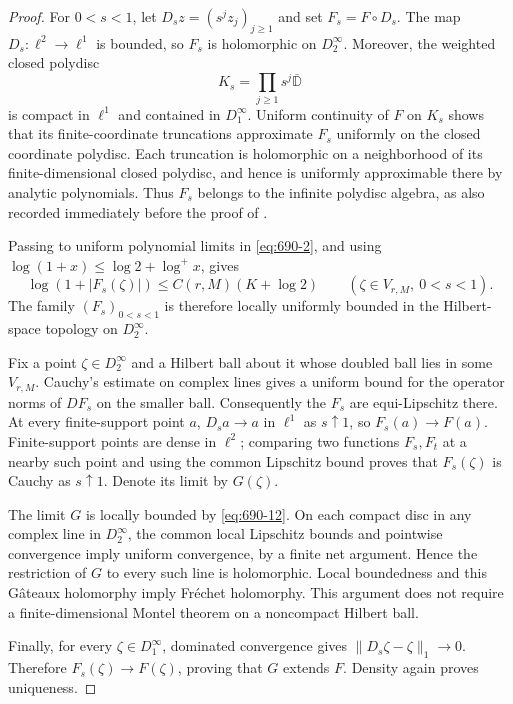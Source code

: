 \documentclass[11pt,a4paper]{article}
\theoremstyle{remark}
\begin{document}
\begin{proof}
For $0<s<1$, let $D_s z=(s^jz_j)_{j\ge1}$ and set
$F_s=F\circ D_s$.  The map $D_s:\ell^2\to\ell^1$ is bounded,
so $F_s$ is holomorphic on $D_2^\infty$.
Moreover, the weighted closed polydisc
\[
 K_s=\prod_{j\ge1}s^j\overline{\mathbb D}
\]
is compact in $\ell^1$ and contained in $D_1^\infty$.
Uniform continuity of $F$ on $K_s$ shows that its finite-coordinate
truncations approximate $F_s$ uniformly on the closed coordinate
polydisc.  Each truncation is holomorphic on a neighborhood of its
finite-dimensional closed polydisc, and hence is uniformly
approximable there by analytic polynomials.  Thus $F_s$ belongs to the
infinite polydisc algebra, as also recorded immediately before the
proof of \cite[Proposition 2.3]{GuoNiZhou2025}.

Passing to uniform polynomial limits in \eqref{eq:690-2}, and using
$\log(1+x)\le\log2+\log^+x$, gives
\begin{equation}
 \log(1+|F_s(\zeta)|)
 \le C(r,M)(K+\log2)
 \qquad(\zeta\in V_{r,M},\ 0<s<1).
 \label{eq:690-12}
\end{equation}
The family $(F_s)_{0<s<1}$ is therefore locally uniformly bounded in
the Hilbert-space topology on $D_2^\infty$.

Fix a point $\zeta\in D_2^\infty$ and a Hilbert ball about it whose
doubled ball lies in some $V_{r,M}$.  Cauchy's estimate on complex
lines gives a uniform bound for the operator norms of $DF_s$ on the
smaller ball.  Consequently the $F_s$ are equi-Lipschitz there.
At every finite-support point $a$, $D_sa\to a$ in $\ell^1$ as
$s\uparrow1$, so $F_s(a)\to F(a)$.
Finite-support points are dense in $\ell^2$; comparing two functions
$F_s,F_t$ at a nearby such point and using the common Lipschitz bound
proves that $F_s(\zeta)$ is Cauchy as $s\uparrow1$.
Denote its limit by $G(\zeta)$.

The limit $G$ is locally bounded by \eqref{eq:690-12}.  On each compact disc
in any complex line in $D_2^\infty$, the common local Lipschitz bounds
and pointwise convergence imply uniform convergence, by a finite
net argument.  Hence the restriction of $G$ to every such line is
holomorphic.  Local boundedness and this G\^ateaux holomorphy imply
Fr\'echet holomorphy.  This argument does not require a
finite-dimensional Montel theorem on a noncompact Hilbert ball.

Finally, for every $\zeta\in D_1^\infty$, dominated convergence gives
$\|D_s\zeta-\zeta\|_1\to0$.  Therefore
$F_s(\zeta)\to F(\zeta)$, proving that $G$ extends $F$.
Density again proves uniqueness.
\end{proof}
\end{document}
